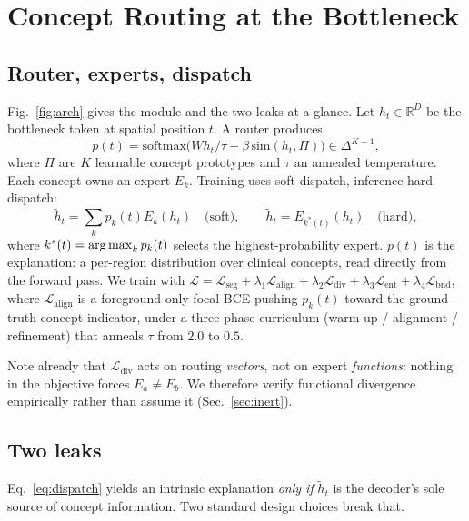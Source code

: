 \section{Concept Routing at the Bottleneck}
\label{sec:method}



\subsection{Router, experts, dispatch}
Fig.~\ref{fig:arch} gives the module and the two leaks at a glance.
Let $h_t\in\mathbb{R}^D$ be the bottleneck token at spatial position $t$. A router produces
\begin{equation}
p(t)=\mathrm{softmax}\!\big(W h_t/\tau + \beta\,\mathrm{sim}(h_t,\Pi)\big)\in\Delta^{K-1},
\label{eq:router}
\end{equation}
where $\Pi$ are $K$ learnable concept prototypes and $\tau$ an annealed temperature. Each concept
owns an expert $E_k$. Training uses soft dispatch, inference hard dispatch:
\begin{equation}
\tilde h_t=\!\sum_k p_k(t)E_k(h_t)\quad\text{(soft)},
\qquad
\tilde h_t=E_{k^\ast(t)}(h_t)\quad\text{(hard)},
\label{eq:dispatch}
\end{equation}
where $k^\ast(t)=\operatorname*{arg\,max}_k p_k(t)$ selects the highest-probability expert.
$p(t)$ is the explanation: a per-region distribution over clinical concepts, read directly from
the forward pass. We train with
$\mathcal{L}=\mathcal{L}_{\text{seg}}+\lambda_1\mathcal{L}_{\text{align}}
+\lambda_2\mathcal{L}_{\text{div}}+\lambda_3\mathcal{L}_{\text{ent}}
+\lambda_4\mathcal{L}_{\text{bnd}}$, where $\mathcal{L}_{\text{align}}$ is a foreground-only focal
BCE pushing $p_k(t)$ toward the ground-truth concept indicator, under a three-phase curriculum
(warm-up / alignment / refinement) that anneals $\tau$ from $2.0$ to $0.5$.

Note already that $\mathcal{L}_{\text{div}}$ acts on routing \emph{vectors}, not on expert
\emph{functions}: nothing in the objective forces $E_a\neq E_b$. We therefore verify functional
divergence empirically rather than assume it (Sec.~\ref{sec:inert}).

\subsection{Two leaks}
\label{sec:leaks}
Eq.~\ref{eq:dispatch} yields an intrinsic explanation \emph{only if} $\tilde h_t$ is the decoder's
sole source of concept information. Two standard design choices break that.

